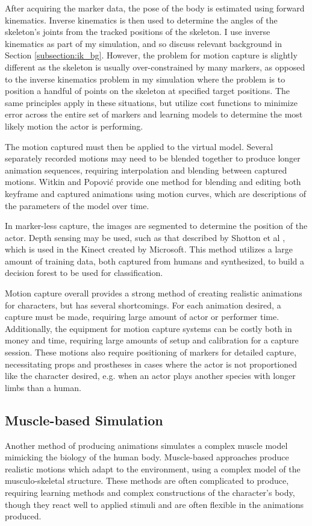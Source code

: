 After acquiring the marker data, the pose of the body is estimated using forward kinematics.  Inverse kinematics is then used to determine the angles of the skeleton's joints from the tracked positions of the skeleton.  I use inverse kinematics as part of my simulation, and so discuss relevant background in Section \ref{subsection:ik_bg}.  However, the problem for motion capture is slightly different as the skeleton is usually over-constrained by many markers, as opposed to the inverse kinematics problem in my simulation where the problem is to position a handful of points on the skeleton at specified target positions.  The same principles apply in these situations, but utilize cost functions to minimize error across the entire set of markers and learning models to determine the most likely motion the actor is performing.

The motion captured must then be applied to the virtual model.  Several separately recorded motions may need to be blended together to produce longer animation sequences, requiring interpolation and blending between captured motions.  Witkin and Popovi\'{c} provide one method for blending and editing both keyframe and captured animations using motion curves, which are descriptions of the parameters of the model over time.

In marker-less capture, the images are segmented to determine the position of the actor.  Depth sensing may be used, such as that described by Shotton et al \cite{shotton_kinect}, which is used in the Kinect created by Microsoft.  This method utilizes a large amount of training data, both captured from humans and synthesized, to build a decision forest to be used for classification.

Motion capture overall provides a strong method of creating realistic animations for characters, but has several shortcomings.  For each animation desired, a capture must be made, requiring large amount of actor or performer time.  Additionally, the equipment for motion capture systems can be costly both in money and time, requiring large amounts of setup and calibration for a capture session.  These motions also require positioning of markers for detailed capture, necessitating props and prostheses in cases where the actor is not proportioned like the character desired, e.g. when an actor plays another species with longer limbs than a human.

\subsection{Muscle-based Simulation}
\label{subsection:muscle_sim_bg}
Another method of producing animations simulates a complex muscle model mimicking the biology of the human body. Muscle-based approaches produce realistic motions which adapt to the environment, using a complex model of the musculo-skeletal structure. These methods are often complicated to produce, requiring learning methods and complex constructions of the character's body, though they react well to applied stimuli and are often flexible in the animations produced.

